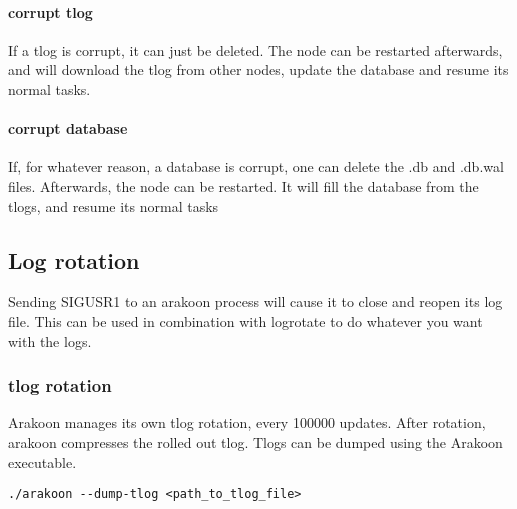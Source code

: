 \documentclass[notitlepage]{article}
\begin{document}
\paragraph{corrupt tlog}
If a tlog is corrupt, it can just be deleted. The node can be restarted afterwards, and will download the tlog from other nodes, update the database and resume its normal tasks.
\paragraph{corrupt database}
If, for whatever reason, a database is corrupt, one can delete the .db and .db.wal files.
Afterwards, the node can be restarted. 
It will fill the database from the tlogs, and resume its normal tasks
\subsection{Log rotation}
Sending SIGUSR1 to an arakoon process will cause it to close and reopen its log file.
This can be used in combination with logrotate to do whatever you want with the logs.

\subsubsection{tlog rotation}
Arakoon manages its own tlog rotation, every 100000 updates. 
After rotation, arakoon compresses the rolled out tlog. 
Tlogs can be dumped using the Arakoon executable.
\begin{verbatim}
./arakoon --dump-tlog <path_to_tlog_file>
\end{verbatim}
\end{document}
